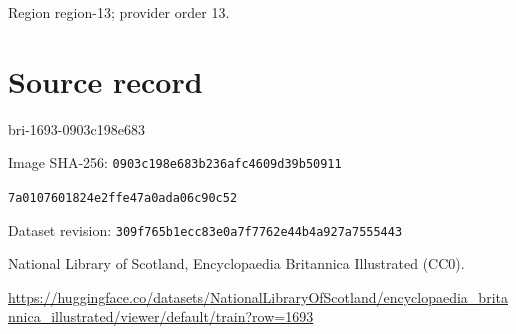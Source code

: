 \documentclass[11pt]{article}
\begin{document}
{\scriptsize\color{gray} Region region-13; provider order 13.\par}
\medskip
\newpage\section*{Source record}
bri-1693-0903c198e683\par
Image SHA-256: \texttt{0903c198e683b236afc4609d39b50911}\par\texttt{7a0107601824e2ffe47a0ada06c90c52}\par
Dataset revision: \texttt{309f765b1ecc83e0a7f7}\texttt{762e44b4a927a7555443}\par
National Library of Scotland, Encyclopaedia Britannica Illustrated (CC0).\par
\url{https://huggingface.co/datasets/NationalLibraryOfScotland/encyclopaedia_britannica_illustrated/viewer/default/train?row=1693}
\end{document}
